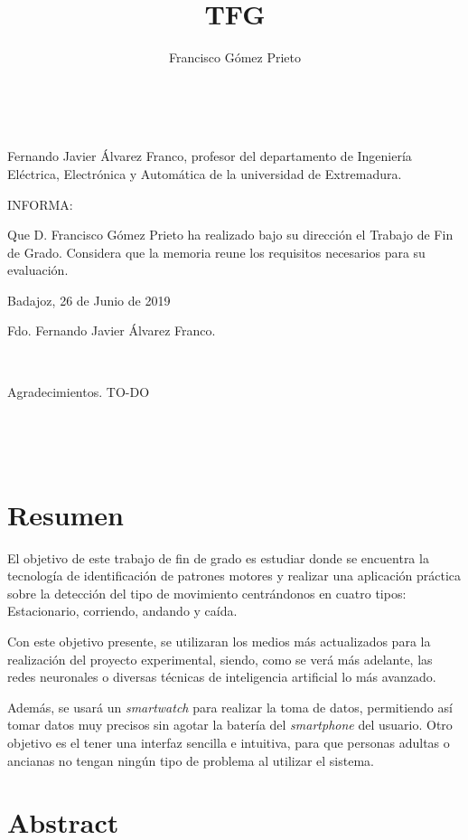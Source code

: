 \documentclass[12pt]{article}
\title{TFG}
\author{Francisco Gómez Prieto}
\date{}
\numberwithin{equation}{section}
\begin{document}
\pagestyle{empty}
\lstset{language=Java}


\newpage
~

\newpage
Fernando Javier Álvarez Franco, profesor del departamento de Ingeniería Eléctrica, Electrónica y Automática de la universidad de Extremadura.

INFORMA:

Que D. Francisco Gómez Prieto ha realizado bajo su dirección el Trabajo de Fin de Grado. Considera que la memoria reune los requisitos necesarios para su evaluación.

\medskip

\begin{flushright}
Badajoz, 26 de Junio de 2019
\end{flushright}

\vspace{8\baselineskip}
\begin{center}
Fdo. Fernando Javier Álvarez Franco.
\end{center}
\newpage
~
\newpage

Agradecimientos. TO-DO

\newpage
~
\newpage
\setcounter{page}{1}
\pagestyle{plain}
\tableofcontents

\newpage
~

\newpage
\section*{Resumen}
El objetivo de este trabajo de fin de grado es estudiar donde se encuentra la tecnología de identificación de patrones motores y realizar una aplicación práctica sobre la detección del tipo de movimiento centrándonos en cuatro tipos: Estacionario, corriendo, andando y caída.

Con este objetivo presente, se utilizaran los medios más actualizados para la realización del proyecto experimental, siendo, como se verá más adelante, las redes neuronales o diversas técnicas de inteligencia artificial lo más avanzado. 

Además, se usará un \textit{smartwatch} para realizar la toma de datos, permitiendo así tomar datos muy precisos sin agotar la batería del \textit{smartphone} del usuario. Otro objetivo es el tener una interfaz sencilla e intuitiva, para que personas adultas o ancianas no tengan ningún tipo de problema al utilizar el sistema.


\newpage
\section*{Abstract}
\end{document}
